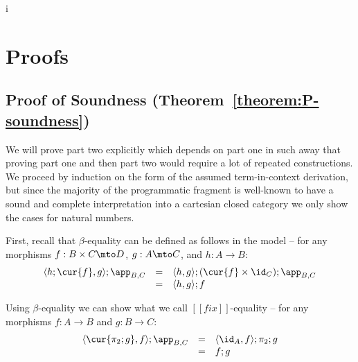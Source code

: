 i\section{Proofs}
\label{sec:proofs}

\subsection{Proof of Soundness (Theorem~\ref{theorem:P-soundness})}
\label{subsec:proof_of_soundness}
We will prove part two explicitly which depends on part one in such
away that proving part one and then part two would require a lot of
repeated constructions.  We proceed by induction on the form of the
assumed term-in-context derivation, but since the majority of the
programmatic fragment is well-known to have a sound and complete
interpretation into a cartesian closed category we only show the cases
for natural numbers.

First, recall that $\beta$-equality can be defined as follows in the
model -- for any morphisms $f : B \times C \mto D$, $g : A \mto C$,
and $h : A \to B$:
\[
\begin{array}{lllll}
  \langle h;\cur{f},g \rangle; \app_{B,C} & = &  \langle h,g \rangle;(\cur{f} \times \id_C);\app_{B,C}\\
  & = & \langle h, g\rangle;f\\
\end{array}
\]

Using $\beta$-equality we can show what we call $[[fix]]$-equality --
for any morphisms $f : A \to B$ and $g : B \to C$:
\[
\begin{array}{llll}
  \langle \cur{\pi_2;g},f \rangle;\app_{B,C}
  & = & \langle \id_A, f \rangle;\pi_2;g\\
  & = & f;g\\
\end{array}
\]

